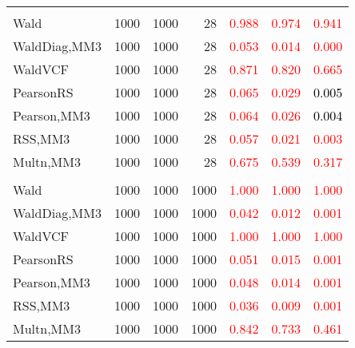 \documentclass[
]{article}
\begin{document}
\begin{table}[H]
{\begin{tabular}[t]{lrrrrrr}
\addlinespace[0.3em]
\multicolumn{7}{l}{\textbf{2F 10V}}\\
\hspace{1em}Wald & 1000 & 1000 & 28 & \textcolor{red}{0.988} & \textcolor{red}{0.974} & \textcolor{red}{0.941}\\
\hspace{1em}WaldDiag,MM3 & 1000 & 1000 & 28 & \textcolor{red}{0.053} & \textcolor{red}{0.014} & \textcolor{red}{0.000}\\
\hspace{1em}WaldVCF & 1000 & 1000 & 28 & \textcolor{red}{0.871} & \textcolor{red}{0.820} & \textcolor{red}{0.665}\\
\hspace{1em}PearsonRS & 1000 & 1000 & 28 & \textcolor{red}{0.065} & \textcolor{red}{0.029} & \textcolor{black}{0.005}\\
\hspace{1em}Pearson,MM3 & 1000 & 1000 & 28 & \textcolor{red}{0.064} & \textcolor{red}{0.026} & \textcolor{black}{0.004}\\
\hspace{1em}RSS,MM3 & 1000 & 1000 & 28 & \textcolor{red}{0.057} & \textcolor{red}{0.021} & \textcolor{red}{0.003}\\
\hspace{1em}Multn,MM3 & 1000 & 1000 & 28 & \textcolor{red}{0.675} & \textcolor{red}{0.539} & \textcolor{red}{0.317}\\
\addlinespace[0.3em]
\multicolumn{7}{l}{\textbf{3F 15V}}\\
\hspace{1em}Wald & 1000 & 1000 & 1000 & \textcolor{red}{1.000} & \textcolor{red}{1.000} & \textcolor{red}{1.000}\\
\hspace{1em}WaldDiag,MM3 & 1000 & 1000 & 1000 & \textcolor{red}{0.042} & \textcolor{red}{0.012} & \textcolor{red}{0.001}\\
\hspace{1em}WaldVCF & 1000 & 1000 & 1000 & \textcolor{red}{1.000} & \textcolor{red}{1.000} & \textcolor{red}{1.000}\\
\hspace{1em}PearsonRS & 1000 & 1000 & 1000 & \textcolor{red}{0.051} & \textcolor{red}{0.015} & \textcolor{red}{0.001}\\
\hspace{1em}Pearson,MM3 & 1000 & 1000 & 1000 & \textcolor{red}{0.048} & \textcolor{red}{0.014} & \textcolor{red}{0.001}\\
\hspace{1em}RSS,MM3 & 1000 & 1000 & 1000 & \textcolor{red}{0.036} & \textcolor{red}{0.009} & \textcolor{red}{0.001}\\
\hspace{1em}Multn,MM3 & 1000 & 1000 & 1000 & \textcolor{red}{0.842} & \textcolor{red}{0.733} & \textcolor{red}{0.461}\\
\bottomrule
\end{tabular}}
\endgroup{}
\end{table}
\end{document}
